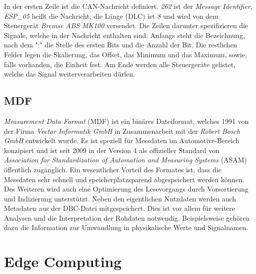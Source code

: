 In der ersten Zeile ist die CAN-Nachricht definiert. \textit{262} ist der \textit{Message Identifier}, \textit{ESP\_05} heißt die Nachricht, die Länge (DLC) ist \textit{8} und wird von dem Steuergerät \textit{Bremse ABS MK100} versendet. Die Zeilen darunter spezifizieren die Signale, welche in der Nachricht enthalten sind. Anfangs steht die Bezeichnung, nach dem ":" die Stelle des ersten Bits und die Anzahl der Bit. Die restlichen Felder legen die Skalierung, das Offset, das Minimum und das Maximum, sowie, falls vorhanden, die Einheit fest. Am Ende werden alle Steuergeräte gelistet, welche das Signal weiterverarbeiten dürfen.

\subsection{MDF}

\textit{Measurement Data Format} (MDF) \cite{ASAM14} ist ein binäres Dateiformat, welches 1991 von der Firma \textit{Vector Informatik GmbH} in Zusammenarbeit mit der \textit{Robert Bosch GmbH} entwickelt wurde. Es ist speziell für Messdaten im Automotive-Bereich konzipiert und ist seit 2009 in der Version 4 als offizieller Standard von \textit{Association for Standardization of Automation and Measuring Systems} (ASAM) öffentlich zugänglich. Ein wesentlicher Vorteil des Formates ist, dass die Messdaten sehr schnell und speicherplatzsparend abgespeichert werden können. Des Weiteren wird auch eine Optimierung des Lesevorgangs durch Vorsortierung und Indizierung unterstützt. Neben den eigentlichen Nutzdaten werden auch Metadaten aus der DBC-Datei mitgespeichert. Dies ist vor allem für weitere Analysen und die Interpretation der Rohdaten notwendig. Beispielsweise gehören dazu die Information zur Umwandlung in physikalische Werte und Signalnamen.

\section{Edge Computing}
\label{sec:edge_computing}

